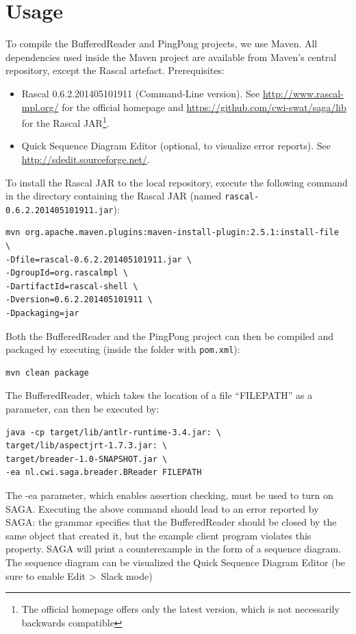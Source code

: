 \documentclass{article}
\begin{document}
\section{Usage}
To compile the BufferedReader and PingPong projects, we use Maven.
All dependencies used inside the Maven project are available from Maven's central repository, except the Rascal artefact. Prerequisites:
\begin{itemize}
\item Rascal 0.6.2.201405101911 (Command-Line version). See \url{http://www.rascal-mpl.org/} for the official homepage and \url{https://github.com/cwi-swat/saga/lib} for the Rascal JAR\footnote{The official homepage offers only the latest version, which is not necessarily backwards compatible}.
\item Quick Sequence Diagram Editor (optional, to visualize error reports). See \url{http://sdedit.sourceforge.net/}.
\end{itemize}
To install the Rascal JAR to the local repository, execute the following command in the directory containing the Rascal JAR (named \lstinline+rascal-0.6.2.201405101911.jar+):
\begin{lstlisting}
mvn org.apache.maven.plugins:maven-install-plugin:2.5.1:install-file  \
-Dfile=rascal-0.6.2.201405101911.jar \
-DgroupId=org.rascalmpl \
-DartifactId=rascal-shell \
-Dversion=0.6.2.201405101911 \
-Dpackaging=jar
\end{lstlisting}
Both the BufferedReader and the PingPong project can then be compiled and packaged by executing (inside the folder with \lstinline+pom.xml+):
\begin{lstlisting}
mvn clean package
\end{lstlisting}
The BufferedReader, which takes the location of a file ``FILEPATH'' as a parameter, can then be executed by:
\begin{lstlisting}
java -cp target/lib/antlr-runtime-3.4.jar: \
target/lib/aspectjrt-1.7.3.jar: \
target/breader-1.0-SNAPSHOT.jar \
-ea nl.cwi.saga.breader.BReader FILEPATH
\end{lstlisting}
The -ea parameter, which enables assertion checking, must be used to turn on SAGA.
Executing the above command should lead to an error reported by SAGA: the grammar specifies that the BufferedReader should be closed by the same object that created it,  but the example client program violates this property.  SAGA will print a counterexample in the form of a sequence diagram.  The sequence diagram can be visualized the Quick Sequence Diagram Editor (be sure to enable Edit \textgreater\ Slack mode)
\end{document}
